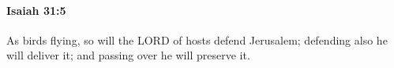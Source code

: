
		\paragraph{Isaiah 31:5} %
			\label{ISAIAH-31-5}

			As birds flying, so will the LORD of hosts defend Jerusalem; defending also he will deliver it; and passing over he will preserve it.


